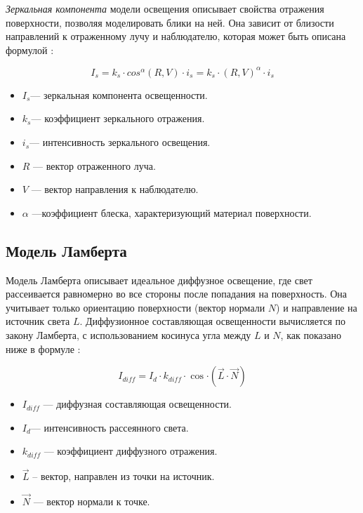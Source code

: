 \textit{Зеркальная компонента} модели освещения описывает свойства отражения поверхности, позволяя моделировать блики на ней. Она зависит от близости направлений к отраженному лучу и наблюдателю, которая может быть описана формулой \cite{lightmodf}:

\begin{equation}
	I_{s}=k_{s} \cdot cos^{\alpha}(R, V) \cdot i_{s} = k_{s} \cdot (R, V)^{\alpha} \cdot i_{s}
\end{equation}

\begin{itemize}
	\item 	$I_{s}$​ --- зеркальная компонента освещенности.
	\item $k_{s}$​ --- коэффициент зеркального отражения.
	\item $i_{s}$​ --- интенсивность зеркального освещения.
	\item $R$ --- вектор отраженного луча.
	\item $V$ --- вектор направления к наблюдателю.
	\item $\alpha$ ---коэффициент блеска, характеризующий материал поверхности.
\end{itemize}

\subsection{Модель Ламберта}

Модель Ламберта описывает идеальное диффузное освещение, где свет рассеивается равномерно во все стороны после попадания на поверхность. \cite{lightmodf} Она учитывает только ориентацию поверхности (вектор нормали $N$) и направление на источник света $L$. Диффузионное составляющая освещенности вычисляется по закону Ламберта, с использованием косинуса угла между $L$ и $N$, как показано ниже в формуле \cite{light_mod}:


\begin{equation}
	I_{diff}=I_{d} \cdot k_{diff} \cdot \cos{\cdot (\vec L \cdot \vec N)}
\end{equation}

\begin{itemize}
	\item $I_{diff}​$ --- диффузная составляющая освещенности.
	\item $I_{d}$​ --- интенсивность рассеянного света.
	\item $k_{diff}​$ --- коэффициент диффузного отражения.
	\item $\vec L$ -- вектор, направлен из точки на источник.
	\item $\vec N$ --- вектор нормали к точке.
\end{itemize}


